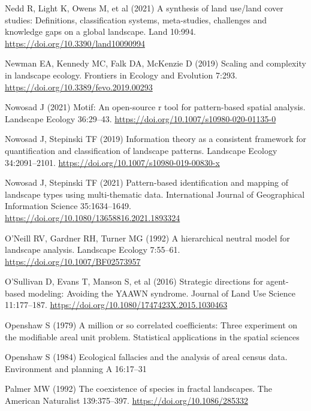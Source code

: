 \documentclass[
  10pt,
  a4paperpaper,
]{article}
\newlength{\cslhangindent}
\newenvironment{CSLReferences}[2] %
 {\begin{list}{}{%
  \setlength{\itemindent}{0pt}
  \setlength{\leftmargin}{0pt}
  \setlength{\parsep}{0pt}
  \ifodd #1
   \setlength{\leftmargin}{\cslhangindent}
   \setlength{\itemindent}{-1\cslhangindent}
  \fi
  \setlength{\itemsep}{#2\baselineskip}}}
 {\end{list}}
\begin{document}
\begin{CSLReferences}{1}{1}
Nedd R, Light K, Owens M, et al (2021) A synthesis of land use/land
cover studies: Definitions, classification systems, meta-studies,
challenges and knowledge gaps on a global landscape. Land 10:994.
\url{https://doi.org/10.3390/land10090994}

Newman EA, Kennedy MC, Falk DA, McKenzie D (2019) Scaling and complexity
in landscape ecology. Frontiers in Ecology and Evolution 7:293.
\url{https://doi.org/10.3389/fevo.2019.00293}

Nowosad J (2021) Motif: An open-source r tool for pattern-based spatial
analysis. Landscape Ecology 36:29--43.
\url{https://doi.org/10.1007/s10980-020-01135-0}

Nowosad J, Stepinski TF (2019) Information theory as a consistent
framework for quantification and classification of landscape patterns.
Landscape Ecology 34:2091--2101.
\url{https://doi.org/10.1007/s10980-019-00830-x}

Nowosad J, Stepinski TF (2021) Pattern-based identification and mapping
of landscape types using multi-thematic data. International Journal of
Geographical Information Science 35:1634--1649.
\url{https://doi.org/10.1080/13658816.2021.1893324}

O'Neill RV, Gardner RH, Turner MG (1992) A hierarchical neutral model
for landscape analysis. Landscape Ecology 7:55--61.
\url{https://doi.org/10.1007/BF02573957}

O'Sullivan D, Evans T, Manson S, et al (2016) Strategic directions for
agent-based modeling: Avoiding the YAAWN syndrome. Journal of Land Use
Science 11:177--187. \url{https://doi.org/10.1080/1747423X.2015.1030463}

Openshaw S (1979) A million or so correlated coefficients: Three
experiment on the modifiable areal unit problem. Statistical
applications in the spatial sciences

Openshaw S (1984) Ecological fallacies and the analysis of areal census
data. Environment and planning A 16:17--31

Palmer MW (1992) The coexistence of species in fractal landscapes. The
American Naturalist 139:375--397. \url{https://doi.org/10.1086/285332}


\end{CSLReferences}
\end{document}

